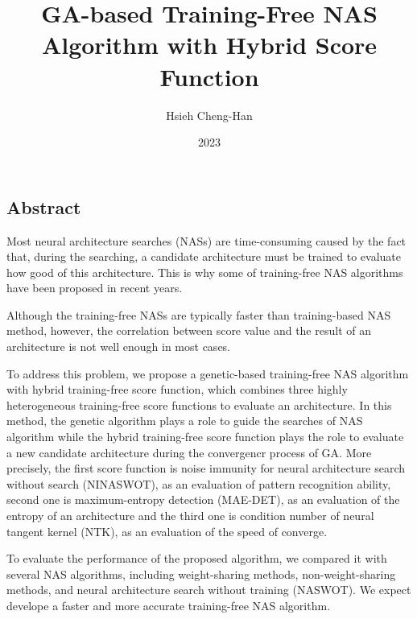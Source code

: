 \documentclass[twocolumn,10pt]{article}
\title{GA-based Training-Free NAS Algorithm with Hybrid Score Function}
\author{Hsieh Cheng-Han}
\date{2023}
\begin{document}
\begin{CJK*}{UTF8}{bsmi}

\maketitle

\section{Abstract}

    Most neural architecture searches (NASs) are time-consuming caused by 
    the fact that, during the searching, a candidate architecture must be 
    trained to evaluate how good of this architecture. This is why some of 
    training-free NAS algorithms have been proposed in recent years.

    Although the training-free NASs are typically faster than training-based 
    NAS method, however, the correlation between score value and the result 
    of an architecture is not well enough in most cases.
    
    To address this problem, we propose a genetic-based training-free NAS 
    algorithm with hybrid training-free score function, which combines three 
    highly heterogeneous training-free score functions to evaluate an architecture. 
    In this method, the genetic algorithm plays a role to guide the searches 
    of NAS algorithm while the hybrid training-free score function plays the 
    role to evaluate a new candidate architecture during the convergencr process 
    of GA. More precisely, the first score function is noise immunity for 
    neural architecture search without search (NINASWOT), as an evaluation of 
    pattern recognition ability, second one is maximum-entropy detection (MAE-DET), 
    as an evaluation of the entropy of an architecture and the third one is 
    condition number of neural tangent kernel (NTK), as an evaluation of 
    the speed of converge.
    
    To evaluate the performance of the proposed algorithm, we compared it 
    with several NAS algorithms, including weight-sharing methods, 
    non-weight-sharing methods, and neural architecture search without training (NASWOT). 
    We expect develope a faster and more accurate training-free NAS algorithm.

\begin{thebibliography}{9}
\end{thebibliography}


\end{CJK*}
\end{document}
